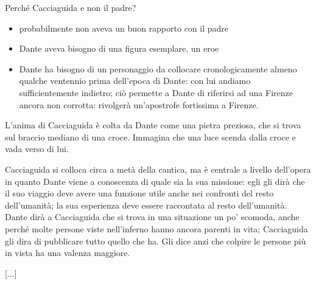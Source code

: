 \documentclass[a4paper, twoside, titlepage]{book}
\newcommand{\salt}{\hspace{1em}[...]}
\begin{document}
Perché Cacciaguida e non il padre?
\begin{itemize}
\item probabilmente non aveva un buon rapporto con il padre
\item Dante aveva bisogno di una figura esemplare, un eroe
\item Dante ha bisogno di un personaggio da collocare cronologicamente almeno qualche ventennio prima dell’epoca di Dante: con lui andiamo sufficientemente indietro; ciò permette a Dante di riferirsi ad una Firenze ancora non corrotta: rivolgerà un’apostrofe fortissima a Firenze.
\end{itemize}

L’anima di Cacciaguida è colta da Dante come una pietra preziosa, che si trova sul braccio mediano di una croce. Immagina che una luce scenda dalla croce e vada verso di lui.

Cacciaguida si colloca circa a metà della cantica, ma è centrale a livello dell’opera in quanto Dante viene a conoscenza di quale sia la sua missione: egli gli dirà che il suo viaggio deve avere una funzione utile anche nei confronti del resto dell’umanità; la sua esperienza deve essere raccontata al resto dell’umanità.
Dante dirà a Cacciaguida che si trova in una situazione un po’ scomoda, anche perché molte persone viste nell’inferno hanno ancora parenti in vita; Cacciaguida gli dira di pubblicare tutto quello che ha. Gli dice anzi che colpire le persone più in vista ha una valenza maggiore.

\vspace{1.5em}
\salt
\end{document}
